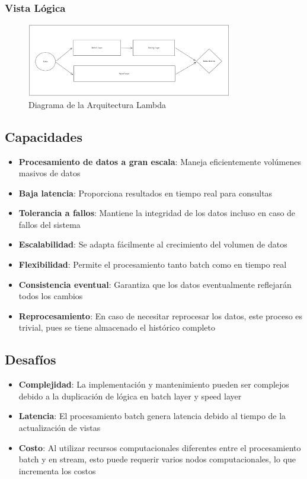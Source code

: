 \newpage
\subsubsection{Vista Lógica}
\begin{figure}[h]
\centering
\includegraphics[width=0.8\textwidth]{teorico/arquitecturas/lambda.png}
\caption{Diagrama de la Arquitectura Lambda}
\label{fig:arquitectura_lambda}
\end{figure}
\clearpage
\newpage

\subsection{Capacidades}
\begin{itemize}
\item \textbf{Procesamiento de datos a gran escala}: Maneja eficientemente volúmenes masivos de datos
\item \textbf{Baja latencia}: Proporciona resultados en tiempo real para consultas
\item \textbf{Tolerancia a fallos}: Mantiene la integridad de los datos incluso en caso de fallos del sistema
\item \textbf{Escalabilidad}: Se adapta fácilmente al crecimiento del volumen de datos
\item \textbf{Flexibilidad}: Permite el procesamiento tanto batch como en tiempo real
\item \textbf{Consistencia eventual}: Garantiza que los datos eventualmente reflejarán todos los cambios
\item \textbf{Reprocesamiento}: En caso de necesitar reprocesar los datos, este proceso es trivial, pues se tiene almacenado el histórico completo
\end{itemize}

\subsection{Desafíos}
\begin{itemize}
\item \textbf{Complejidad}: La implementación y mantenimiento pueden ser complejos debido a la duplicación de lógica en batch layer y speed layer
\item \textbf{Latencia}: El procesamiento batch genera latencia debido al tiempo de la actualización de vistas
\item \textbf{Costo}: Al utilizar recursos computacionales diferentes entre el procesamiento batch y en stream, esto puede requerir varios nodos computacionales, lo que incrementa los costos
\end{itemize}
\newpage